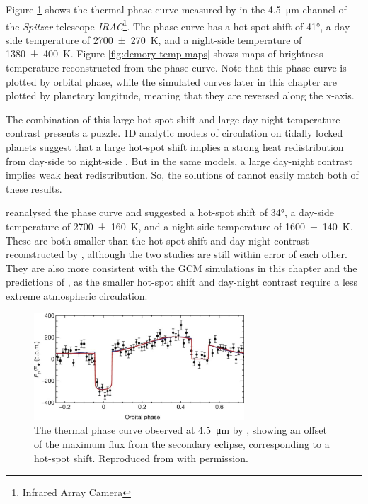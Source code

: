 Figure \ref{fig:demory-phase-curve} shows the thermal phase curve measured by \citet{demory201655cnce} in the \SI{4.5}{\micro\metre} channel of the \textit{Spitzer} telescope \textit{IRAC}\footnote{Infrared Array Camera}. The phase curve has a hot-spot shift of \ang{41}, a day-side temperature of \SI[separate-uncertainty = true]{2700(270)}{\kelvin}, and a night-side temperature of \SI[separate-uncertainty = true]{1380(400)}{\kelvin}. Figure \ref{fig:demory-temp-maps} shows maps of brightness temperature reconstructed from the phase curve. Note that this phase curve is plotted by orbital phase, while the simulated curves later in this chapter are plotted by planetary longitude, meaning that they are reversed along the x-axis.

The combination of this large hot-spot shift and large day-night temperature contrast presents a puzzle. 1D analytic models of circulation on tidally locked planets suggest that a large hot-spot shift implies a strong heat redistribution from day-side to night-side \citep{zhang2017dynamics}. But in the same models, a large day-night contrast implies weak heat redistribution. So, the solutions of \citet{zhang2017dynamics} cannot easily match both of these results.

\citet{angelo201755cnce} reanalysed the phase curve and suggested a hot-spot shift of \ang{34}, a day-side temperature of \SI[separate-uncertainty = true]{2700(160)}{\kelvin}, and a night-side temperature of \SI[separate-uncertainty = true]{1600(140)}{\kelvin}. These are both smaller than the hot-spot shift and day-night contrast reconstructed by \citet{demory201655cnce}, although the two studies are still within error of each other. They are also more consistent with the GCM simulations in this chapter and the predictions of \citet{zhang2017dynamics}, as the smaller hot-spot shift and day-night contrast require a less extreme atmospheric circulation.


\begin{figure}
  \centering
  \includegraphics[width=0.7\textwidth]{figures/linking-climate-55cnce/demory-phase-curve.jpg}
\caption{The thermal phase curve observed at \SI{4.5}{\micro\metre} by \citet{demory201655cnce}, showing an offset of the maximum flux from the secondary eclipse, corresponding to a hot-spot shift. Reproduced from \citet{demory201655cnce} with permission.}\label{fig:demory-phase-curve}
\end{figure}

